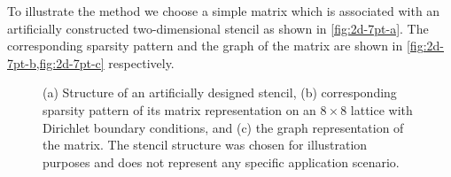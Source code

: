 To illustrate the method we choose a
simple matrix which is associated with an artificially constructed
two-dimensional stencil as shown in \cref{fig:2d-7pt-a}. The
corresponding sparsity pattern and the graph of the matrix are shown
in \cref{fig:2d-7pt-b,fig:2d-7pt-c} respectively.
\begin{figure}[tbp]
	\centering
	\hspace{0.8em}
	\hspace{1em}
	\caption{(a) Structure of an artificially designed stencil,
	(b) corresponding sparsity pattern of its matrix
	representation on an $8\times 8$ lattice with Dirichlet
	boundary conditions, and (c) the graph representation of the
	matrix. The stencil
	structure was chosen for illustration purposes and does not
	represent any specific application scenario.}
	\label{fig:2d-7pt}
\end{figure}


